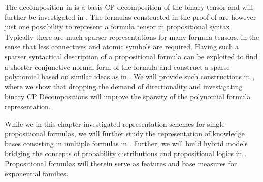 \begin{remark}
    The decomposition in  is a basis CP decomposition of the binary tensor and will further be investigated in .
    The formulas constructed in the proof of  are however just one possibility to represent a formula tensor in propositional syntax.
    Typically there are much sparser representations for many formula tensors, in the sense that less connectives and atomic symbols are required.
    Having such a sparser syntactical description of a propositional formula can be exploited to find a shorter conjunctive normal form of the formula and construct a sparse polynomial based on similar ideas as in .
    We will provide such constructions in , where we show that dropping the demand of directionality and investigating binary CP Decompositions will improve the sparsity of the polynomial formula representation.
\end{remark}



While we in this chapter investigated representation schemes for single propositional formulas, we will further study the representation of knowledge bases consisting in multiple formulas in .
Further, we will build hybrid models bridging the concepts of probability distributions and propositional logics in .
Propositional formulas will therein serve as features and base measures for exponential families.

